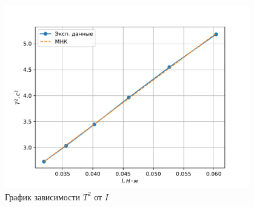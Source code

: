 \begin{figure}[ht]
  \begin{center}
    \includegraphics[width=0.95\textwidth]{figures/t_squared.pdf}
  \end{center}
  \caption{График зависимости $T^2$ от $I$}\label{fig:t_squared}
\end{figure}
